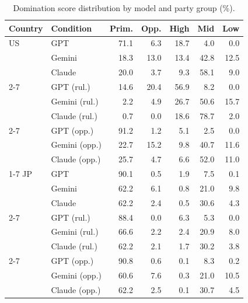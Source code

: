 \begin{table}[t]
\centering
\footnotesize
\setlength{\tabcolsep}{3pt}
\caption{Domination score distribution by model and party group (\%).}
\label{tab:domination-score-distribution-values}
\begin{tabular}{llrrrrr}
\toprule
\textbf{Country} & \textbf{Condition} & \textbf{Prim.} & \textbf{Opp.} & \textbf{High} & \textbf{Mid} & \textbf{Low} \\
\midrule
US & GPT & 71.1 & 6.3 & 18.7 & 4.0 & 0.0 \\
 & Gemini & 18.3 & 13.0 & 13.4 & 42.8 & 12.5 \\
 & Claude & 20.0 & 3.7 & 9.3 & 58.1 & 9.0 \\
\cmidrule(lr){2-7}
 & GPT (rul.) & 14.6 & 20.4 & 56.9 & 8.2 & 0.0 \\
 & Gemini (rul.) & 2.2 & 4.9 & 26.7 & 50.6 & 15.7 \\
 & Claude (rul.) & 0.7 & 0.0 & 18.6 & 78.7 & 2.0 \\
\cmidrule(lr){2-7}
 & GPT (opp.) & 91.2 & 1.2 & 5.1 & 2.5 & 0.0 \\
 & Gemini (opp.) & 22.7 & 15.2 & 9.8 & 40.7 & 11.6 \\
 & Claude (opp.) & 25.7 & 4.7 & 6.6 & 52.0 & 11.0 \\
\cmidrule(lr){1-7}
JP & GPT & 90.1 & 0.5 & 1.9 & 7.5 & 0.1 \\
 & Gemini & 62.2 & 6.1 & 0.8 & 21.0 & 9.8 \\
 & Claude & 62.2 & 2.4 & 0.5 & 30.6 & 4.3 \\
\cmidrule(lr){2-7}
 & GPT (rul.) & 88.4 & 0.0 & 6.3 & 5.3 & 0.0 \\
 & Gemini (rul.) & 66.6 & 2.2 & 2.4 & 20.9 & 8.0 \\
 & Claude (rul.) & 62.2 & 2.1 & 1.7 & 30.2 & 3.8 \\
\cmidrule(lr){2-7}
 & GPT (opp.) & 90.8 & 0.6 & 0.1 & 8.3 & 0.2 \\
 & Gemini (opp.) & 60.6 & 7.6 & 0.3 & 21.0 & 10.5 \\
 & Claude (opp.) & 62.2 & 2.5 & 0.1 & 30.7 & 4.5 \\
\bottomrule
\end{tabular}
\end{table}

